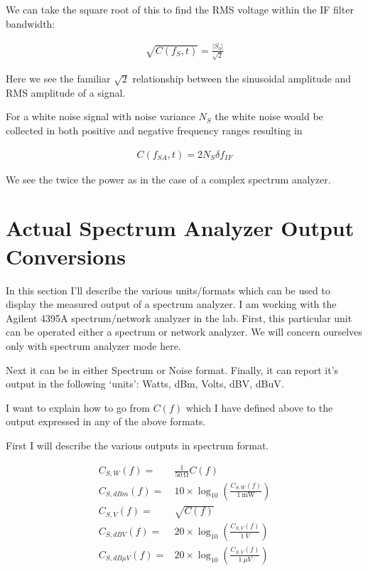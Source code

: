 \documentclass[12pt]{article}
\begin{document}
We can take the square root of this to find the RMS voltage within the IF filter bandwidth:

\begin{align}
\sqrt{C(f_S,t)} = \frac{|S_0|}{\sqrt{2}}
\end{align}

Here we see the familiar $\sqrt{2}$ relationship between the sinusoidal amplitude and RMS amplitude of a signal.

For a white noise signal with noise variance $N_S$ the white noise would be collected in both positive and negative frequency ranges resulting in

\begin{align}
C(f_{SA}, t) = 2 N_S \delta f_{IF}
\end{align}

We see the twice the power as in the case of a complex spectrum analyzer.

\section{Actual Spectrum Analyzer Output Conversions}

In this section I'll describe the various units/formats which can be used to display the measured output of a spectrum analyzer.
I am working with the Agilent 4395A spectrum/network analyzer in the lab.
First, this particular unit can be operated either a spectrum or network analyzer.
We will concern ourselves only with spectrum analyzer mode here.

Next it can be in either Spectrum or Noise format.
Finally, it can report it's output in the following `units': Watts, dBm, Volts, dBV, dBuV.

I want to explain how to go from $C(f)$ which I have defined above to the output expressed in any of the above formats.

First I will describe the various outputs in spectrum format.

\begin{align}
C_{S, W}(f) =& \frac{1}{\SI{50}{\ohm}} C(f)\\
C_{S, dBm}(f) =& 10 \times \log_{10}\left(\frac{C_{S, W}(f)}{\SI{1}{\mW}}\right)\\
C_{S, V}(f) =& \sqrt{C(f)}\\
C_{S, dBV}(f) =& 20 \times \log_{10}\left(\frac{C_{S, V}(f)}{\SI{1}{V}}\right)\\
C_{S, dB\mu V}(f) =& 20 \times \log_{10}\left(\frac{C_{S, V}(f)}{\SI{1}{\mu V}}\right)\\
\end{align}
\end{document}
